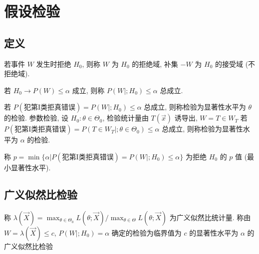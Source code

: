 \chapter{假设检验}

\section{定义}

若事件 $W$ 发生时拒绝 $H_0$, 则称 $W$ 为 $H_0$ 的拒绝域, 补集 $-W$ 为 $H_0$ 的接受域 (不拒绝域).

若 $H_0\rightarrow P(W)\le\alpha$ 成立, 则称 $P(W|;H_0)\le\alpha$ 总成立.

若 $P(\text{犯第I类拒真错误})=P(W|;H_0)\le\alpha$ 总成立, 则称检验为显著性水平为 $\theta$ 的检验. 参数检验, 设 $H_0:\theta\in\Theta_0$, 检验统计量由 $T(\vec{x})$ 诱导出, $W=T\in W_T$ 若 $P(\text{犯第I类拒真错误})=P(T\in W_T|;\theta\in\Theta_0)\le\alpha$ 总成立, 则称检验为显著性水平为 $\alpha$ 的检验.

称 $p=\min\{\alpha|P(\text{犯第I类拒真错误})=P(W|;H_0)\le\alpha\}$ 为拒绝 $H_0$ 的 $p$ 值 (最小显著性水平).

\section{广义似然比检验}

称 $\lambda(\vec{X})=\max_{\theta\in\Theta_0}L(\theta;\vec{X})/\max_{\theta\in\Theta}L(\theta;\vec{X})$ 为广义似然比统计量. 称由 $W={\lambda(\vec{X})\le c}$, $P(W|;H_0)=\alpha$ 确定的检验为临界值为 $c$ 的显著性水平为 $\alpha$ 的广义似然比检验
